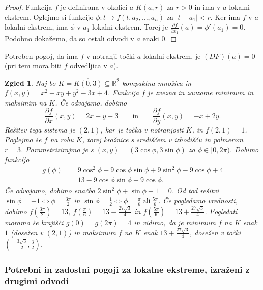 \documentclass[10pt, a4paper]{article}
\newtheorem{zgled}{Zgled}[section]
\newenvironment{noticeC}{%
  \tcolorbox[%
  notitle,
  empty,
  enhanced,  %
  breakable,
  coltext=black, 
  fontupper=\rmfamily,
  parbox=false,
  noparskip,
  sharp corners,
  boxrule=-1pt,  %
  frame hidden,
  left=7pt,  %
  right=7pt,
  top=5pt,
  bottom=5pt,
  before skip=2.5ex plus 2pt,
  after skip=2.5ex plus 2pt,
  overlay unbroken and last={%
  },
  ]}
{\endtcolorbox}
\newenvironment{dokaz}%
  {\begin{noticeC}\begin{proof}}%
  {\end{proof}\end{noticeC}}
\newcommand{\R}{\mathbb {R}}
\begin{document}
\begin{dokaz}
    Funkcija $f$ je definirana v okolici $a$ $K(a, r)$ za $r > 0$ in ima v $a$ lokalni ekstrem.
    Oglejmo si funkcijo $\phi: t \mapsto f(t, a_2, \dots, a_n)$ za $|t - a_1| <r$.
    Ker ima $f$ v $a$ lokalni ekstrem, ima $\phi$ v $a_1$ lokalni ekstrem.
    Torej je $\frac{\partial f}{\partial x_1} (a) = \phi' (a_1) = 0$.
    Podobno dokažemo, da so ostali odvodi v $a$ enaki $0$.
\end{dokaz}

Potreben pogoj, da ima $f$ v notranji točki $a$ lokalni ekstrem, je $(DF)(a) = 0$ (pri tem mora biti $f$
odvedljica v $a$).

\begin{zgled}
    Naj bo $K = \overline{K(0, 3)} \subseteq \R^2$ kompaktna množica in 
    $f(x, y) = x^2 - xy + y^2 - 3x + 4$.
    Funkcija $f$ je zvezna in zavzame minimum in maksimim na $K$.
    Če odvajamo, dobimo $$\frac{\partial f}{\partial x} (x, y) = 2x - y - 3\qquad \mathrm{in} 
    \qquad \frac{\partial f}{\partial y} (x, y) = -x + 2y.$$
    Rešitev tega sistema je $(2, 1)$, kar je točka v notranjosti $K$, in $f(2, 1) = 1$.
    Poglejmo še $f$ na robu $K$, torej krožnice s središčem v izhodišču in polmerom $r = 3$.
    Parametrizirajmo je s $(x, y) = (3 \cos \phi, 3 \sin \phi)$ za $\phi \in [0, 2 \pi)$.
    Dobimo funkcijo 
    \begin{align*}
        g(\phi) &= 9 \cos^2 \phi - 9 \cos \phi \sin \phi + 9 \sin^2 \phi - 9 \cos \phi + 4\\
        &= 13 - 9 \cos \phi \sin \phi - 9 \cos \phi.
    \end{align*}
    Če odvajamo, dobimo enačbo $2 \sin^2 \phi + \sin \phi - 1 = 0$.
    Od tod rešitvi $\sin \phi = - 1 \Leftrightarrow \phi = \frac{3 \pi}{2}$ in $\sin \phi = \frac{1}{2} \Leftrightarrow \phi = \frac{\pi}{6}\ \mathrm{ali}\ \frac{5\pi}{6}$.
    Če pogledamo vrednosti, dobimo $f \left(\frac{3\pi}{2}\right) = 13$, $f \left(\frac{\pi}{6}\right) = 13 - \frac{27 \sqrt{3}}{4}$ in $f \left(\frac{5\pi}{6}\right) = 13 + \frac{27 \sqrt{3}}{4}$.
    Pogledati moramo še krajišči $g(0) = g(2 \pi) = 4$ in vidimo, da je minimum $f$ na $K$ enak $1$ (dosežen v $(2, 1)$)
    in maksimum $f$ na $K$ enak $13 + \frac{27 \sqrt{3}}{4}$, dosežen v točki $\left(-\frac{3 \sqrt{3}}{2}, \frac{3}{2}\right)$.
\end{zgled}

\subsubsection{Potrebni in zadostni pogoji za lokalne ekstreme, izraženi z drugimi odvodi}
\end{document}
